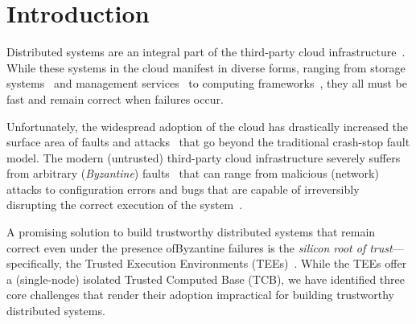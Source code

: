 \section{Introduction}
Distributed systems are an integral part of the third-party cloud infrastructure~\cite{amazon_ec2, microsoft_azure, rackspace, google_engine}. While these systems in the cloud manifest in diverse forms, ranging from storage systems~\cite{dynamo, azure_storage, tao, spanner, 51, zippy, AmazonS3} and management services~\cite{Hunt:2010, Burns2016} to computing frameworks~\cite{aws_lambda, azure_functions, google_cloud_functions}, they all must be fast and remain correct when failures occur. %

Unfortunately, the widespread adoption of the cloud has drastically increased the surface area of faults and attacks~\cite{Gunawi_bugs-in-the-cloud, Shinde2016, high_resolution_side_channels} that go beyond the traditional crash-stop fault model\cite{delporte}. The modern (untrusted) third-party cloud infrastructure severely suffers from arbitrary ({\em Byzantine}) faults~\cite{Lamport:1982} that can range from malicious (network) attacks to configuration errors and bugs that are capable of irreversibly disrupting the correct execution of the system~\cite{Gunawi_bugs-in-the-cloud, Shinde2016, high_resolution_side_channels, Castro:2002}.  %



A promising solution to build trustworthy distributed systems that remain correct even under the presence of\linebreak Byzantine failures is the {\em silicon root of trust}---specifically, the Trusted Execution Environments (TEEs)~\cite{cryptoeprint:2016:086, arm-realm, amd-sev, riscv-multizone, intelTDX}. While the TEEs offer a (single-node) isolated Trusted Computed Base (TCB),  we have identified three core challenges that render their adoption impractical for building trustworthy distributed systems.

